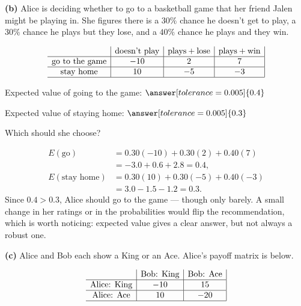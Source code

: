 \documentclass[12pt]{ximera}
\begin{document}
\begin{problem}
\begin{prompt}
\textbf{(b)} Alice is deciding whether to go to a basketball game that her friend
Jalen might be playing in. She figures there is a $30\%$ chance he doesn't get to
play, a $30\%$ chance he plays but they lose, and a $40\%$ chance he plays and they
win.

\[
\begin{array}{c|c|c|c|}
\phantom{|} & \text{doesn't play} & \text{plays}+\text{lose} & \text{plays}+\text{win} \\\hline
\text{go to the game} & -10 & 2 & 7 \\\hline
\text{stay home} & 10 & -5 & -3 \\\hline
\end{array}
\]

Expected value of going to the game: $\answer[tolerance=0.005]{0.4}$

\smallskip
Expected value of staying home: $\answer[tolerance=0.005]{0.3}$

\smallskip
Which should she choose?
\begin{multipleChoice}
\end{multipleChoice}

\begin{solution}
\begin{align*}
E(\text{go}) &= 0.30(-10) + 0.30(2) + 0.40(7)\\
&= -3.0 + 0.6 + 2.8 = 0.4,\\[4pt]
E(\text{stay home}) &= 0.30(10) + 0.30(-5) + 0.40(-3)\\
&= 3.0 - 1.5 - 1.2 = 0.3.
\end{align*}
Since $0.4 > 0.3$, Alice should go to the game --- though only barely. A small change
in her ratings or in the probabilities would flip the recommendation, which is worth
noticing: expected value gives a clear answer, but not always a robust one.
\end{solution}
\end{prompt}

\begin{prompt}
\textbf{(c)} Alice and Bob each show a King or an Ace. Alice's payoff matrix is below.

\[
\begin{array}{c|c|c|}
\phantom{|} & \text{Bob: King} & \text{Bob: Ace} \\\hline
\text{Alice: King} & -10 & 15 \\\hline
\text{Alice: Ace} & 10 & -20 \\\hline
\end{array}
\]


\end{prompt}
\end{problem}
\end{document}
